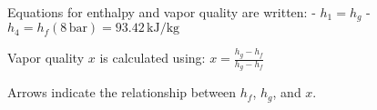 Equations for enthalpy and vapor quality are written:  
- \( h_1 = h_g \)  
- \( h_4 = h_f(8 \, \text{bar}) = 93.42 \, \text{kJ/kg} \)  

Vapor quality \( x \) is calculated using:  
\( x = \frac{h_g - h_f}{h_g - h_f} \)  

Arrows indicate the relationship between \( h_f \), \( h_g \), and \( x \).